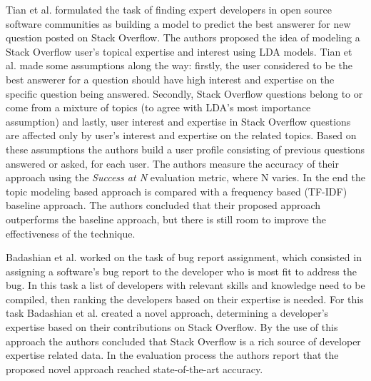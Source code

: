         Tian et al. \cite{tian2013predicting} formulated the task of finding expert developers in open source software communities as building a model to predict the best answerer for new question posted on Stack Overflow. The authors proposed the idea of modeling a Stack Overflow user's topical expertise and interest using LDA models. Tian et al. made some assumptions along the way: firstly, the user considered to be the best answerer for a question should have high interest and expertise on the specific question being answered. Secondly, Stack Overflow questions belong to or come from a mixture of topics (to agree with LDA's most importance assumption) and lastly, user interest and expertise in Stack Overflow questions are affected only by user's interest and expertise on the related topics. Based on these assumptions the authors build a user profile consisting of previous questions answered or asked, for each user. The authors measure the accuracy of their approach using the \emph{Success at N} evaluation metric, where N varies. In the end the topic modeling based approach is compared with a frequency based (TF-IDF) baseline approach. The authors concluded that their proposed approach outperforms the baseline approach, but there is still room to improve the effectiveness of the technique.
        
        Badashian et al. \cite{badashian2016crowdsourced} worked on the task of bug report assignment, which consisted in assigning a software's bug report to the developer who is most fit to address the bug. In this task a list of developers with relevant skills and knowledge need to be compiled, then ranking the developers based on their expertise is needed. For this task Badashian et al. created a novel approach, determining a developer’s expertise based on their contributions on Stack Overflow. By the use of this approach the authors concluded that Stack Overflow is a rich source of developer expertise related data. In the evaluation process the authors report that the proposed novel approach reached state-of-the-art accuracy.
        
